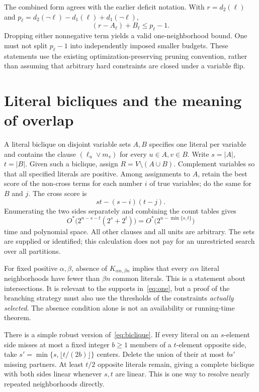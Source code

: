 \documentclass[11pt,a4paper]{article}
\theoremstyle{definition}
\newcommand{\Ostar}{O^{*}}
\begin{document}
The combined form agrees with the earlier deficit notation. With
$r=d_2(\ell)$ and
$p_\ell=d_2(\neg\ell)-d_1(\ell)+d_1(\neg\ell)$,
\[
 (r-A_\ell)+B_\ell\le p_\ell-1.
\]
Dropping either nonnegative term yields a valid one-neighborhood bound.
One must not split $p_\ell-1$ into independently imposed smaller budgets.
These statements use the existing optimization-preserving pruning
convention, rather than assuming that arbitrary hard constraints are closed
under a variable flip.

\section{Literal bicliques and the meaning of overlap}\label{sec:biclique}

A literal biclique on disjoint variable sets $A,B$ specifies one literal
per variable and contains the clause $(\ell_u\lor m_v)$ for every
$u\in A,v\in B$. Write $s=|A|$, $t=|B|$. Given such a biclique, assign
$R=V\setminus(A\cup B)$. Complement variables so that all specified
literals are positive. Among assignments to $A$, retain the best score of
the non-cross terms for each number $i$ of true variables; do the same for
$B$ and $j$. The cross score is
\[
 st-(s-i)(t-j).
\]
Enumerating the two sides separately and combining the count tables gives
\begin{equation}
 \Ostar\bigl(2^{n-s-t}(2^s+2^t)\bigr)
 =\Ostar\bigl(2^{n-\min\{s,t\}}\bigr)
 \label{eq:biclique}
\end{equation}
time and polynomial space. All other clauses and all units are arbitrary.
The sets are supplied or identified; this calculation does not pay for an
unrestricted search over all partitions.

For fixed positive $\alpha,\beta$, absence of $K_{\alpha n,\beta n}$
implies that every $\alpha n$ literal neighborhoods have fewer than
$\beta n$ common literals. This is a statement about intersections.
It is relevant to the supports in~\eqref{eq:one}, but a proof of the
branching strategy must also use the thresholds of the constraints
\emph{actually selected}. The absence condition alone is not an
availability or running-time theorem.

There is a simple robust version of~\eqref{eq:biclique}. If every literal
on an $s$-element side misses at most a fixed integer $b\ge1$ members of
a $t$-element opposite side, take
$s'=\min\{s,\lfloor t/(2b)\rfloor\}$ centers. Delete the union of their
at most $bs'$ missing partners. At least $t/2$ opposite literals remain,
giving a complete biclique with both sides linear whenever $s,t$ are
linear. This is one way to resolve nearly repeated neighborhoods directly.
\end{document}

